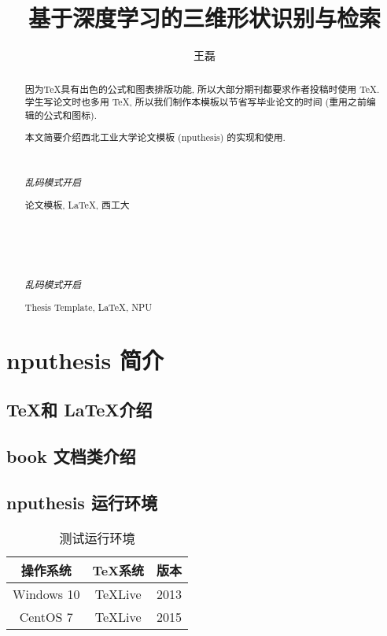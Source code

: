 \documentclass[twoside,UTF8]{nputhesis}
\title[A Thesis Submitted For The Master Degree of Engineering]{基于深度学习的三维形状识别与检索}
\author[Lei Wang]{王磊}
\begin{document}
\makecover  %
\frontmatter

\begin{abstract}  
    因为\TeX 具有出色的公式和图表排版功能, 所以大部分期刊都要求作者投稿时使用
    \TeX. 学生写论文时也多用 \TeX, 所以我们制作本模板以节省写毕业论文的时间 
    (重用之前编辑的公式和图标).

    本文简要介绍西北工业大学论文模板 (nputhesis) 的实现和使用.

    { %
        \noindent\hrulefill\\
        {\centerline {\it 乱码模式开启}}
        \noindent\hrulefill
    }
    \begin{keywords}
        论文模板, \LaTeX, 西工大 
    \end{keywords}
\end{abstract}

\begin{Abstract}

    { %
        \noindent\hrulefill\\
        {\centerline {\it 乱码模式开启}}
        \noindent\hrulefill
    }
    \begin{Keywords}
        Thesis Template, \LaTeX, NPU
    \end{Keywords}
\end{Abstract}

\tableofcontents 

\mainmatter  %
\chapter{nputhesis 简介}
\section{\TeX 和 \LaTeX 介绍}
\section{book 文档类介绍}
\section{nputhesis 运行环境}

\begin{table}[h]
    \caption{测试运行环境}
    \centering
    \begin{tabular}{ccc}
        \toprule
        操作系统    & \TeX 系统   & 版本 \\
        \midrule
        Windows 10  & TeXLive     & 2013 \\
        CentOS 7    & TeXLive     & 2015 \\
        \bottomrule
    \end{tabular}
\end{table}
\end{document}
